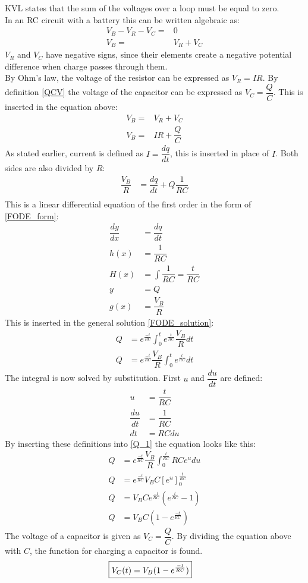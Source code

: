 KVL states that the sum of the voltages over a loop must be equal to zero. 
\\
In an RC circuit with a battery this can be written algebraic as:
\begin{align*}
V_B-V_R-V_C =& 0 \\
V_B=&V_R+V_C
\end{align*}
$V_R$ and $V_C$ have negative signs, since their elements create a negative potential difference when charge passes through them.
\\
By Ohm's law, the voltage of the resistor can be expressed as $V_R=IR$. By definition \eqref{QCV} the voltage of the capacitor can be expressed as $V_C=\dfrac{Q}{C}$. This is inserted in the equation above:
\begin{align*}
V_B=&V_R+V_C \\
V_B =& IR+\dfrac{Q}{C}
\end{align*}
As stated earlier, current is defined as $I =\dfrac{dq}{dt}$, this is inserted in place of $I$. Both sides are also divided by $R$:
\begin{align*}
\dfrac{V_B}{R} &= \dfrac{dq}{dt} + Q\dfrac{1}{RC} \\
\end{align*}
This is a linear differential equation of the first order in the form of \eqref{FODE_form}:
\begin{align*}
\dfrac{dy}{dx}&=\dfrac{dq}{dt}
\\
h(x)&=\dfrac{1}{RC}
\\
H(x)&=\int \dfrac{1}{RC}=\dfrac{t}{RC}
\\
y &= Q
\\
g(x)&= \dfrac{V_B}{R}
\end{align*}
This is inserted in the general solution \eqref{FODE_solution}:
\begin{align}
Q&= e^{\frac{-t}{RC}}\int_{0}^{t}e^{\frac{t}{RC}}\dfrac{V_B}{R}dt
\\
Q&= e^{\frac{-t}{RC}}\dfrac{V_B}{R}\int_{0}^{t}e^{\frac{t}{RC}}dt \label{Q_1}
\end{align}
The integral is now solved by substitution. First $u$ and $\dfrac{du}{dt}$ are defined:
\begin{align*}
u &= \dfrac{t}{RC}
\\
\dfrac{du}{dt}&=\dfrac{1}{RC}
\\
dt &=RC du
\end{align*} 
By inserting these definitions into \eqref{Q_1} the equation looks like this:
\begin{align*}
Q&=e^{\frac{-t}{RC}}\dfrac{V_B}{R}\int_{0}^{\frac{t}{RC}}RCe^u du
\\
Q&=e^{\frac{-t}{RC}} V_B C [e^u]_{0}^{\frac{t}{RC}}
\\
Q&=V_B C e^{\frac{-t}{RC}}(e^{\frac{t}{RC}}-1)
\\
Q&=V_B C (1-e^{\frac{-t}{RC}})
\end{align*} 
The voltage of a capacitor is given as $V_C=\dfrac{Q}{C}$. By dividing the equation above with $C$, the function for charging a capacitor is found.
\begin{align}
\label{V_up}
\Aboxed{
V_C(t)=V_B(1-e^{\frac{-t}{RC}})
}
\end{align}
